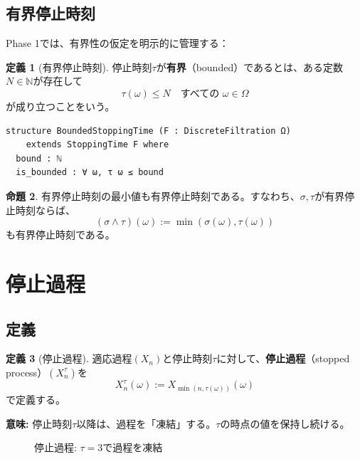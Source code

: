 \documentclass[a4paper,11pt]{ltjsarticle}
\theoremstyle{definition}
\newtheorem{definition}{定義}[section]
\newtheorem{proposition}[definition]{命題}
\begin{document}
\subsection{有界停止時刻}

Phase 1では、有界性の仮定を明示的に管理する：

\begin{definition}[有界停止時刻]
停止時刻$\tau$が\textbf{有界}（bounded）であるとは、ある定数$N \in \mathbb{N}$が存在して
\[
\tau(\omega) \leq N \quad \text{すべての } \omega \in \Omega
\]
が成り立つことをいう。
\end{definition}

\begin{lstlisting}[style=leanstyle,language=ML,caption={BoundedStoppingTimeの定義}]
structure BoundedStoppingTime (F : DiscreteFiltration Ω)
    extends StoppingTime F where
  bound : ℕ
  is_bounded : ∀ ω, τ ω ≤ bound
\end{lstlisting}

\begin{proposition}
有界停止時刻の最小値も有界停止時刻である。すなわち、$\sigma, \tau$が有界停止時刻ならば、
\[
(\sigma \wedge \tau)(\omega) := \min(\sigma(\omega), \tau(\omega))
\]
も有界停止時刻である。
\end{proposition}

\section{停止過程}

\subsection{定義}

\begin{definition}[停止過程]
適応過程$(X_n)$と停止時刻$\tau$に対して、\textbf{停止過程}（stopped process）$(X^{\tau}_n)$を
\[
X^{\tau}_n(\omega) := X_{\min(n, \tau(\omega))}(\omega)
\]
で定義する。
\end{definition}

\textbf{意味:} 停止時刻$\tau$以降は、過程を「凍結」する。$\tau$の時点の値を保持し続ける。

\begin{figure}[h]
\centering
{}
\caption{停止過程: $\tau=3$で過程を凍結}
\label{fig:stopped_process}
\end{figure}
\end{document}
